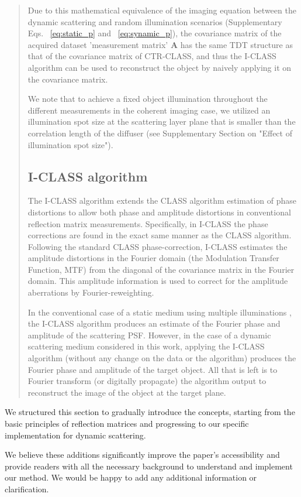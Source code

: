 \documentclass[12pt]{article}
\newenvironment{ourresponse}
    {\begin{tcolorbox}[width=\linewidth,breakable,enhanced,colback=gray!5,colframe=responsecolor!50,title=Response,left=5pt,right=5pt]}
    {\end{tcolorbox}}
\begin{document}
\begin{ourresponse}
\begin{quote}
Due to this mathematical equivalence of the imaging equation between the dynamic scattering and random illumination scenarios (Supplementary Eqs. ~\ref{eq:static_p} and ~\ref{eq:synamic_p}), the covariance matrix of the acquired dataset 'measurement matrix' $\textbf{A}$ has the same TDT structure as that of the covariance matrix of CTR-CLASS, and thus the I-CLASS algorithm can be used to reconstruct the object by naively applying it on the covariance matrix.

We note that to achieve a fixed object illumination throughout the different measurements in the coherent imaging case, we utilized an illumination spot size at the scattering layer plane that is smaller than the correlation length of the diffuser (see Supplementary Section on "Effect of illumination spot size").

\subsection*{I-CLASS algorithm}

The I-CLASS algorithm \cite{weinberg2024noninvasive} extends the CLASS algorithm \cite{choi2022flexible} estimation of phase distortions to allow both phase and amplitude distortions in conventional reflection matrix measurements. 
Specifically, in I-CLASS the phase corrections are found in the exact same manner as the CLASS algorithm. Following the standard CLASS phase-correction, I-CLASS estimates the amplitude distortions in the Fourier domain (the Modulation Transfer Function, MTF) from the diagonal of the covariance matrix in the Fourier domain. This amplitude information is used to correct for the amplitude aberrations by Fourier-reweighting.

In the conventional case of a static medium using multiple illuminations \cite{weinberg2024noninvasive}, the I-CLASS algorithm produces an estimate of the Fourier phase and amplitude of the scattering PSF. However, in the case of a dynamic scattering medium considered in this work, applying the I-CLASS algorithm (without any change on the data or the algorithm) produces the Fourier phase and amplitude of the target object. All that is left is to Fourier transform (or digitally propagate) the algorithm output to reconstruct the image of the object at the target plane.
    
\end{quote}

We structured this section to gradually introduce the concepts, starting from the basic principles of reflection matrices and progressing to our specific implementation for dynamic scattering.

We believe these additions significantly improve the paper's accessibility and provide readers with all the necessary background to understand and implement our method. We would be happy to add any additional information or clarification.

\end{ourresponse}
\end{document}
